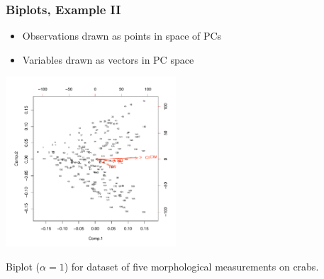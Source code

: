 \documentclass{beamer}
\begin{document}


\begin{frame}
  \frametitle{Biplots, Example II}
\begin{itemize}
\item Observations drawn as points in space of PCs
\item Variables drawn as vectors in PC space
\end{itemize}

\begin{center}
\includegraphics[height=2.5in]{crab-biplot}

{\footnotesize Biplot ($\alpha=1$) for dataset of five morphological measurements on crabs.}
\end{center}


\end{frame}

\end{document}
